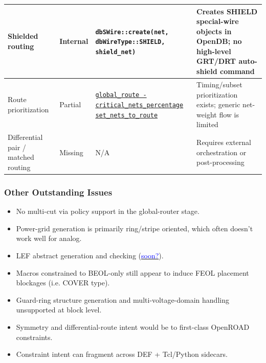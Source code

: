 \begin{frame}
\begin{center}
\begin{tabular}{p{2.6cm}|p{1.2cm}|p{3.9cm}|p{4.0cm}}
      \hline
      Shielded routing &
      Internal &
      \texttt{dbSWire::create(net, dbWireType::SHIELD, shield\_net)} &
      Creates SHIELD special-wire objects in OpenDB; no high-level GRT/DRT auto-shield command \\
      \hline
      Route prioritization &
      Partial &
      \href{https://openroad.readthedocs.io/en/latest/main/src/grt/README.html\#global-route}{\texttt{global\_route -critical\_nets\_percentage}} \newline
      \href{https://openroad.readthedocs.io/en/latest/main/src/grt/README.html\#set-specific-nets-to-route}{\texttt{set\_nets\_to\_route}} &
      Timing/subset prioritization exists; generic net-weight flow is limited \\
      \hline
      Differential pair / matched routing &
      Missing &
      N/A &
      Requires external orchestration or post-processing \\
      \hline
    \end{tabular}
  \end{center}
\end{frame}

\begin{frame}
  \frametitle{Other Outstanding Issues}
  \small
  \begin{itemize}
    \item No multi-cut via policy support in the global-router stage.
    \item Power-grid generation is primarily ring/stripe oriented, which often doesn't work well for analog.
    \item LEF abstract generation and checking (\href{https://github.com/The-OpenROAD-Project/OpenROAD/issues/4872}{\textcolor{blue}{soon?}}).
    \item Macros constrained to BEOL-only still appear to induce FEOL placement blockages (i.e. COVER type).
    \item Guard-ring structure generation and multi-voltage-domain handling unsupported at block level.
    \item Symmetry and differential-route intent would be to first-class OpenROAD constraints.
    \item Constraint intent can fragment across DEF + Tcl/Python sidecars.
  \end{itemize}
\end{frame}

